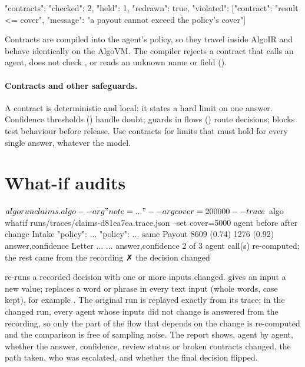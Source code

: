 \begin{plaincode}[title=Audit record (excerpt)]
"contracts": {"checked": 2, "held": 1, "redrawn": true,
              "violated": [{"contract": "result <= cover",
                            "message": "a payout cannot exceed the policy's cover"}]}
\end{plaincode}

Contracts are compiled into the agent's policy, so they travel inside AlgoIR and behave identically on the AlgoVM. The compiler rejects a contract that calls an agent, does not check , or reads an unknown name or field ().

\paragraph{Contracts and other safeguards.} A contract is deterministic and local: it states a hard limit on one answer. Confidence thresholds () handle doubt; guards in flows () route decisions;  blocks test behaviour before release. Use contracts for limits that must hold for every single answer, whatever the model.

\section{What-if audits}

\begin{terminal}
$ algo run claims.algo --arg "note=..." --arg cover=200000 --trace
$ algo whatif runs/traces/claims-d81ea7ea.trace.json --set cover=5000
  agent      before          after           change
  Intake     {"policy": ...}  {"policy": ...}  same
  Payout     8609 (0.74)     1276 (0.92)     answer,confidence
  Letter     ...             ...             answer,confidence
  2 of 3 agent call(s) re-computed; the rest came from the recording
  ✗ the decision changed
\end{terminal}

 re-runs a recorded decision with one or more inputs changed.  gives an input a new value;  replaces a word or phrase in every text input (whole words, case kept), for example . The original run is replayed exactly from its trace; in the changed run, every agent whose inputs did not change is answered from the recording, so only the part of the flow that depends on the change is re-computed and the comparison is free of sampling noise. The report shows, agent by agent, whether the answer, confidence, review status or broken contracts changed, the path taken, who was escalated, and whether the final decision flipped.

